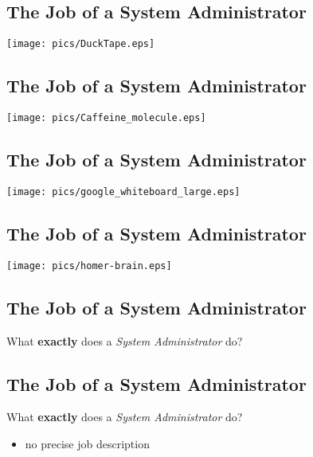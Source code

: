 \documentclass[xga]{xdvislides}
\begin{document}
\subsection{The Job of a System Administrator}
\vspace*{\fill}
\begin{center}
	\texttt{[image: pics/DuckTape.eps]} \\
\end{center}
\vspace*{\fill}

\subsection{The Job of a System Administrator}
\vspace*{\fill}
\begin{center}
	\texttt{[image: pics/Caffeine\_molecule.eps]} \\
\end{center}
\vspace*{\fill}

\subsection{The Job of a System Administrator}
\vspace*{\fill}
\begin{center}
	\texttt{[image: pics/google\_whiteboard\_large.eps]} \\
\end{center}
\vspace*{\fill}

\subsection{The Job of a System Administrator}
\vspace*{\fill}
\begin{center}
	\texttt{[image: pics/homer-brain.eps]} \\
\end{center}
\vspace*{\fill}

\subsection{The Job of a System Administrator}
What {\bf exactly} does a {\em System Administrator} do?

\subsection{The Job of a System Administrator}
What {\bf exactly} does a {\em System Administrator} do?
\begin{itemize}
	\item no precise job description
\end{itemize}
\end{document}

